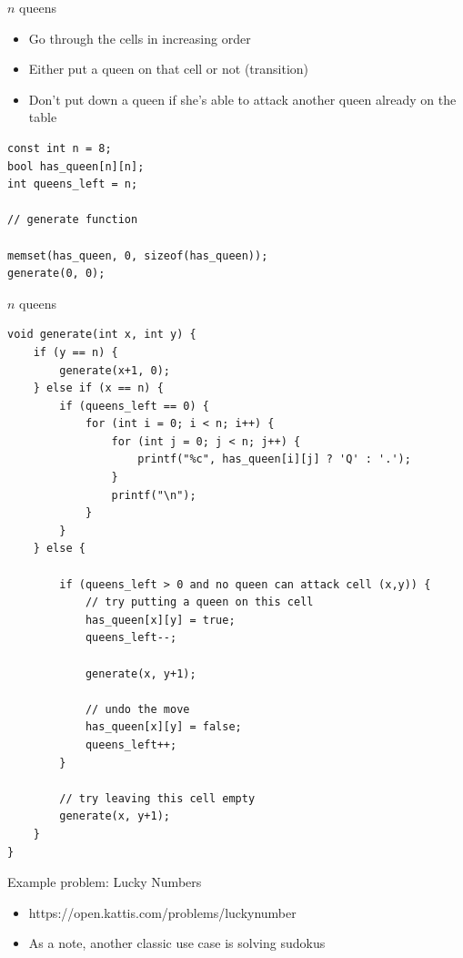 \documentclass{beamer}
\begin{document}
\begin{frame}{$n$ queens}
    \begin{itemize}
        \item Go through the cells in increasing order
        \item Either put a queen on that cell or not (transition)
        \item Don't put down a queen if she's able to attack another queen already on the table
    \end{itemize}

    \vspace{10pt}

    \begin{verbatim}
const int n = 8;
bool has_queen[n][n];
int queens_left = n;

// generate function

memset(has_queen, 0, sizeof(has_queen));
generate(0, 0);
    \end{verbatim}
\end{frame}

\begin{frame}{$n$ queens}
    \begin{verbatim}
void generate(int x, int y) {
    if (y == n) {
        generate(x+1, 0);
    } else if (x == n) {
        if (queens_left == 0) {
            for (int i = 0; i < n; i++) {
                for (int j = 0; j < n; j++) {
                    printf("%c", has_queen[i][j] ? 'Q' : '.');
                }
                printf("\n");
            }
        }
    } else {

        if (queens_left > 0 and no queen can attack cell (x,y)) {
            // try putting a queen on this cell
            has_queen[x][y] = true;
            queens_left--;

            generate(x, y+1);

            // undo the move
            has_queen[x][y] = false;
            queens_left++;
        }

        // try leaving this cell empty
        generate(x, y+1);
    }
}
    \end{verbatim}
\end{frame}

\begin{frame}[plain]{Example problem: Lucky Numbers}
    \begin{itemize}
        \item https://open.kattis.com/problems/luckynumber
        \item As a note, another classic use case is solving sudokus
    \end{itemize}
\end{frame}
\end{document}
